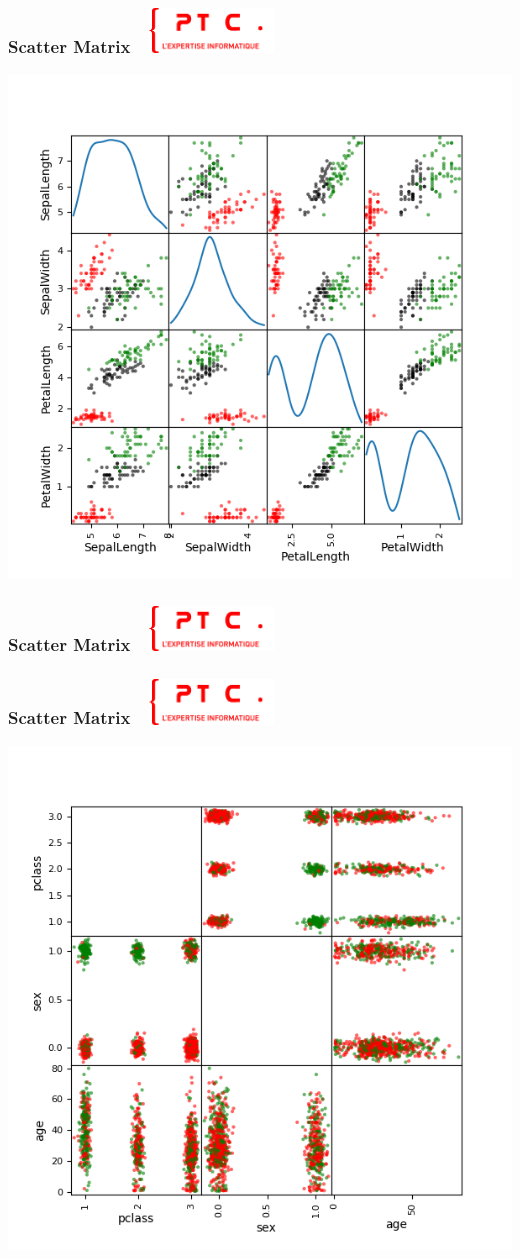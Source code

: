 \documentclass[11pt]{beamer}
\newenvironment{slide}[1]{%
\begin{frame}[environment=slide]
\frametitle{#1~\hfill~\includegraphics[height=1.2cm]{./epitech.png}}
}{%
\end{frame}
}
\newcommand{\Python}[1]{
	{\small	}
}
\begin{document}
\begin{slide}{Scatter Matrix}
\begin{center}
\includegraphics[scale=0.4]{iris_matrix}
\end{center}
\end{slide}


\begin{slide}{Scatter Matrix}
\begin{center}
\Python{scatter_matrix}
\end{center}
\end{slide}

\begin{slide}{Scatter Matrix}
\begin{center}
\includegraphics[scale=0.4]{titanic_matrix}
\end{center}
\end{slide}
\end{document}
